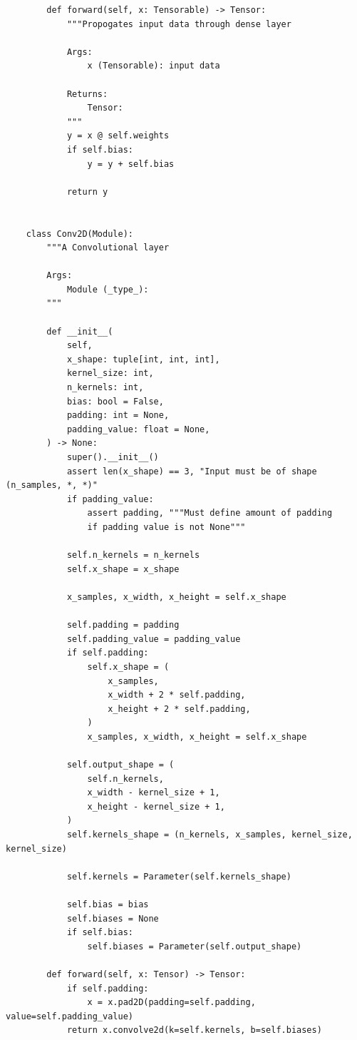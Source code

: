 \documentclass{article}
\begin{document}
\begin{verbatim}
        def forward(self, x: Tensorable) -> Tensor:
            """Propogates input data through dense layer

            Args:
                x (Tensorable): input data

            Returns:
                Tensor:
            """
            y = x @ self.weights
            if self.bias:
                y = y + self.bias

            return y


    class Conv2D(Module):
        """A Convolutional layer

        Args:
            Module (_type_):
        """

        def __init__(
            self,
            x_shape: tuple[int, int, int],
            kernel_size: int,
            n_kernels: int,
            bias: bool = False,
            padding: int = None,
            padding_value: float = None,
        ) -> None:
            super().__init__()
            assert len(x_shape) == 3, "Input must be of shape (n_samples, *, *)"
            if padding_value:
                assert padding, """Must define amount of padding 
                if padding value is not None"""

            self.n_kernels = n_kernels
            self.x_shape = x_shape

            x_samples, x_width, x_height = self.x_shape

            self.padding = padding
            self.padding_value = padding_value
            if self.padding:
                self.x_shape = (
                    x_samples,
                    x_width + 2 * self.padding,
                    x_height + 2 * self.padding,
                )
                x_samples, x_width, x_height = self.x_shape

            self.output_shape = (
                self.n_kernels,
                x_width - kernel_size + 1,
                x_height - kernel_size + 1,
            )
            self.kernels_shape = (n_kernels, x_samples, kernel_size, kernel_size)

            self.kernels = Parameter(self.kernels_shape)

            self.bias = bias
            self.biases = None
            if self.bias:
                self.biases = Parameter(self.output_shape)

        def forward(self, x: Tensor) -> Tensor:
            if self.padding:
                x = x.pad2D(padding=self.padding, value=self.padding_value)
            return x.convolve2d(k=self.kernels, b=self.biases)



\end{verbatim}
\end{document}

